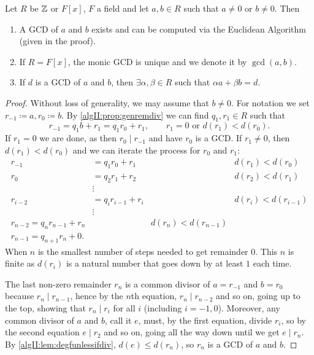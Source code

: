 \documentclass[10pt, a4paper]{article}
\begin{document}
\begin{theorem}
    Let $R$ be $\mathbb{Z}$ or $F[x]$,
    $F$ a field and let $a, b \in R$ such that $a \neq 0$ or $b \neq 0$.
    Then
    \begin{enumerate}[label = \roman*)]
        \item A GCD of $a$ and $b$ exists and can be computed via the Euclidean Algorithm
        (given in the proof).

        \item If $R = F[x]$,
        the monic GCD is unique and we denote it by $\gcd(a, b)$.

        \item If $d$ is a GCD of $a$ and $b$,
        then $\exists \alpha, \beta \in R$ such that $\alpha a + \beta b = d$.
    \end{enumerate}

    \begin{proof}
        Without loss of generality,
        we may assume that $b \neq 0$.
        For notation we set $r_{-1} \coloneqq a, r_0 \coloneqq b$.
        By \autoref{algII:prop:genremdiv} we can find $q_1, r_1 \in R$ such that
        \[
        r_{-1} = q_1b + r_1 = q_1r_0 + r_1,\qquad r_1 = 0\text{ or } d(r_1) < d(r_0).
        \]
        If $r_1 = 0$ we are done,
        as then $r_0 \mid r_{-1}$ and have $r_0$ is a GCD.
        If $r_1 \neq 0$,
        then $d(r_1) < d(r_0)$ and we can iterate the process for $r_0$ and $r_1$:
        \begin{align*}
            r_{-1} &= q_1r_0 + r_1 && d(r_1) < d(r_0) \\
            r_0 &= q_2r_1 + r_2 && d(r_2) < d(r_1) \\
            &\vdots \\
            r_{i - 2} &= q_ir_{i - 1} + r_i && d(r_i) < d(r_{i - 1}) \\
            &\vdots \\
            r_{n - 2} = q_nr_{n - 1} + r_n && d(r_n) < d(r_{n - 1}) \\
            r_{n - 1} = q_{n + 1}r_n + 0.
        \end{align*}
        When $n$ is the smallest number of steps needed to get remainder $0$.
        This $n$ is finite as $d(r_i)$ is a natural number that goes down by at least $1$ each time.

        The last non-zero remainder $r_n$ is a common divisor of $a = r_{-1}$ and $b = r_0$ because $r_n \mid r_{n - 1}$,
        hence by the $n$th equation,
        $r_n \mid r_{n - 2}$ and so on,
        going up to the top,
        showing that $r_n \mid r_i$ for all $i$
        (including $i = -1, 0$).
        Moreover,
        any common divisor of $a$ and $b$,
        call it $e$,
        must,
        by the first equation,
        divide $r_i$,
        so by the second equation $e \mid r_2$ and so on,
        going all the way down until we get $e \mid r_n$.
        By \autoref{algII:lem:degfunlessifdiv},
        $d(e) \leq d(r_n)$,
        so $r_n$ is a GCD of $a$ and $b$.


\end{proof}
\end{theorem}
\end{document}
